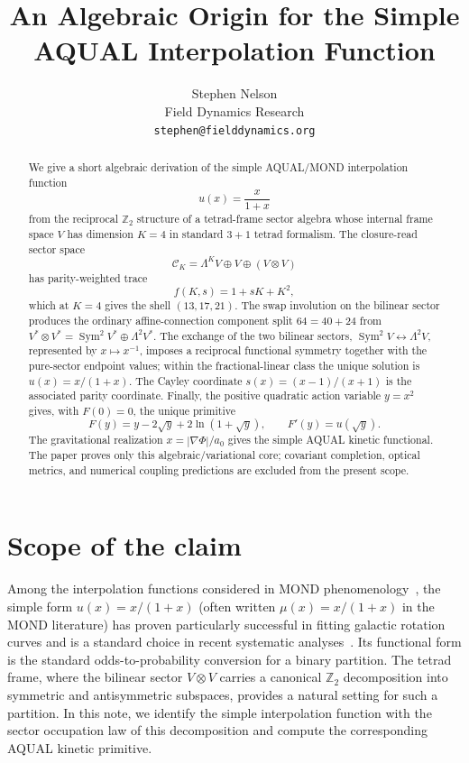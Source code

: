 \documentclass[10pt]{article}
\title{An Algebraic Origin for the Simple AQUAL Interpolation Function}
\author{Stephen Nelson\\
\small Field Dynamics Research\\
\small \texttt{stephen@fielddynamics.org}}
\date{}
\DeclareMathOperator{\Sym}{Sym}
\begin{document}
\maketitle

\begin{abstract}
We give a short algebraic derivation of the simple AQUAL/MOND interpolation
function~\cite{Milgrom1983,FamaeyMcGaugh2012}
\[
        u(x)=\frac{x}{1+x}
\]
from the reciprocal $\mathbb Z_2$ structure of a tetrad-frame sector algebra
whose internal frame space $V$ has dimension $K=4$ in standard $3+1$ tetrad
formalism. The closure-read sector space
\[
        \mathcal C_K=\Lambda^K V\oplus V\oplus(V\otimes V)
\]
has parity-weighted trace
\[
        f(K,s)=1+sK+K^2,
\]
which at $K=4$ gives the shell $(13,17,21)$.  The swap involution on the
bilinear sector produces the ordinary affine-connection component split
$64=40+24$ from
$V^*\otimes V^*=\Sym^2 V^*\oplus \Lambda^2V^*$. The exchange of the two
bilinear sectors, $\Sym^2V\leftrightarrow\Lambda^2V$, represented by
$x\mapsto x^{-1}$, imposes a reciprocal functional symmetry together with the
pure-sector endpoint values; within the fractional-linear class the unique
solution is $u(x)=x/(1+x)$.  The Cayley
coordinate $s(x)=(x-1)/(x+1)$ is the associated parity coordinate.
Finally, the positive
quadratic action variable $y=x^2$ gives, with $F(0)=0$, the unique primitive
\[
        F(y)=y-2\sqrt y+2\ln(1+\sqrt y),\qquad F'(y)=u(\sqrt y).
\]
The gravitational realization $x=|\nabla\Phi|/a_0$ gives the simple
AQUAL kinetic functional. The paper proves only this algebraic/variational
core; covariant completion, optical metrics, and numerical coupling predictions
are excluded from the present scope.
\end{abstract}

\section{Scope of the claim}
Among the interpolation functions considered in MOND
phenomenology~\cite{Milgrom1983}, the simple form $u(x)=x/(1+x)$ (often
written $\mu(x)=x/(1+x)$ in the MOND literature) has
proven particularly successful in fitting galactic rotation curves and is
a standard choice in recent systematic
analyses~\cite{FamaeyMcGaugh2012}.  Its functional form is the
standard odds-to-probability conversion for a binary partition.  The
tetrad frame, where the bilinear sector $V\otimes V$ carries a canonical
$\mathbb Z_2$ decomposition into symmetric and antisymmetric subspaces,
provides a natural setting for such a partition.  In this note, we
identify the simple interpolation function with the sector occupation law
of this decomposition and compute the corresponding AQUAL kinetic
primitive.
\end{document}
